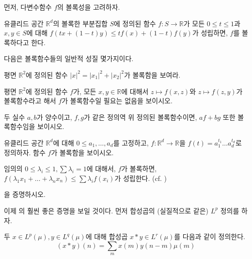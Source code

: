 먼저, 다변수함수 $f$의 볼록성을 고려하자.
\begin{definition}
\label{def:multiconvex}  
    유클리드 공간 $\mathbb{R}^d$의 볼록한 부분집합 $S$에 정의된 함수 $f: S \to \mathbb{R}$가 모든 $0 \leq t \leq 1$과 $x, y \in S$에 대해 $f(tx + (1 - t)y) \leq tf(x) + (1 - t)f(y)$가 성립하면, $f$를 볼록하다고 한다.
\end{definition}

다음은 볼록함수들의 일반적 성질 몇가지이다.

\begin{exercise}
    평면 $\mathbb{R}^2$에 정의된 함수 $|x|^2 = |x_1|^2 + |x_2|^2$가 볼록함을 보여라.
\end{exercise}
\begin{exercise}
    평면 $\mathbb{R}^2$에 정의된 함수 $f$가, 모든 $x, y \in \mathbb{R}$에 대해서 $z \mapsto f(x, z)$와 $z \mapsto f(z, y)$가 볼록함수라고 해서 $f$가 볼록함수일 필요는 없음을 보이시오.
\end{exercise}
\begin{exercise}
    두 실수 $a, b$가 양수이고, $f, g$가 같은 정의역 위 정의된 볼록함수이면, $af + bg$ 또한 볼록함수임을 보이시오.
\end{exercise}
\begin{exercise}
    유클리드 공간 $\mathbb{R}^d$에 대해 $0 \leq a_1, \dots, a_d$를 고정하고, $f : \mathbb{R}^d \to \mathbb{R}$을 $f(t) = a_1^{t_1} \dots a_d^{t_d}$로 정의하자.
    함수 $f$가 볼록함을 보이시오.
\end{exercise}

\begin{theorem}[Jensen]
\label{thm:multivariatejensen}  
    임의의 $0 \leq \lambda_i \leq 1, \sum \lambda_i = 1$에 대해서, $f$가 볼록하면, $f(\lambda_1 x_1 + \dots + \lambda_n x_n) \leq \sum \lambda_i f(x_i)$가 성립한다. (cf. )
\end{theorem}
\begin{exercise}
    을 증명하시오.
\end{exercise}

이제 의 훨씬 좋은 증명을 보일 것이다.
먼저 합성곱의 (실질적으로 같은) $L^p$ 정의를 하자.
\begin{definition}
    두 $x\in L^p(\mu), y \in L^q(\mu)$에 대해 합성곱 $x * y \in L^r(\mu)$를 다음과 같이 정의한다.
    \begin{equation*}
        (x*y)(n) = \sum_m x(m) y(n - m) \mu(m)
    \end{equation*}
\end{definition}

